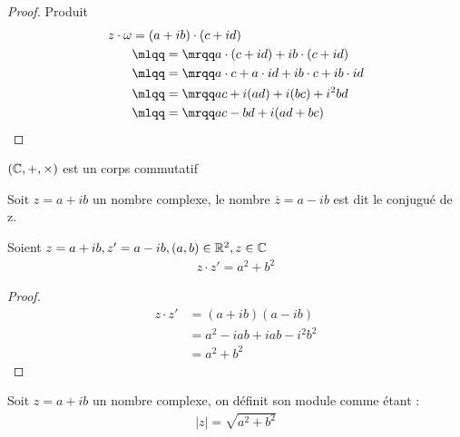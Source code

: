 \begin{graybox}
\begin{proposition}
\begin{enumerate}
\end{enumerate}
\end{proposition}
    \end{graybox}

\begin{proof}{Produit}
\begin{align*}
z \cdot \omega &= (a + ib) \cdot (c + id) \\
          &\mlqq=\mrqq a \cdot (c + id) + ib \cdot (c + id) \\
          &\mlqq=\mrqq a \cdot c + a \cdot id + ib \cdot c + ib \cdot id \\
          &\mlqq=\mrqq ac + i(ad) + i(bc) + i^2 bd \\
          &\mlqq=\mrqq ac - bd + i(ad + bc)
\end{align*}
\end{proof}


\begin{remarque}
    $(\mathbb{C}, +, \times)$ est un corps commutatif 
\end{remarque}

\begin{graybox}
\begin{definition}
    Soit $z = a + ib$ un nombre complexe, le nombre $\overline{z} = a - ib$ est dit le conjugué de z.
\end{definition}
\end{graybox}

\begin{graybox}
\begin{proposition}{}
    Soient $z = a + ib, z'= a - ib, (a, b) \in \mathbb{R}^2, z \in \mathbb{C}$
    \begin{align*}
        z \cdot z' = a^2 + b^2 
    \end{align*}
\end{proposition}
\end{graybox}

\begin{proof}
        \begin{align*}
            z \cdot z' &= (a + ib)(a - ib) \\
                        &= a^2 -iab + iab -i^2b^2 \\
                        &= a^2 + b^2
        \end{align*}
    \end{proof}

\begin{graybox}
\begin{definition}
    Soit $z = a + ib$ un nombre complexe, on définit son module comme étant :
    \begin{align*}
        |z| = \sqrt{a^2 + b^2} 
    \end{align*}
\end{definition}
\end{graybox}

